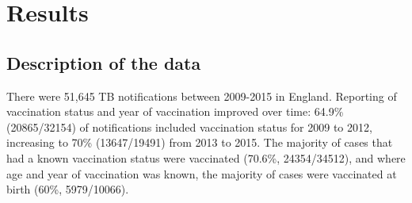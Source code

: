 \documentclass[11pt,twoside]{bristolthesis}
\begin{document}
  \hypertarget{results}{%
  \section{Results}\label{results}}
  
  \hypertarget{description-of-the-data}{%
  \subsection{Description of the data}\label{description-of-the-data}}
  
  There were 51,645 TB notifications between 2009-2015 in England. Reporting of vaccination status and year of vaccination improved over time: 64.9\% (20865/32154) of notifications included vaccination status for 2009 to 2012, increasing to 70\% (13647/19491) from 2013 to 2015. The majority of cases that had a known vaccination status were vaccinated (70.6\%, 24354/34512), and where age and year of vaccination was known, the majority of cases were vaccinated at birth (60\%, 5979/10066).
  
\end{document}
